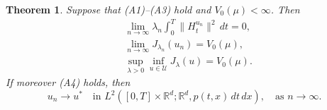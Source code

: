 \documentclass[11pt,leqno]{article}
\theoremstyle{plain}
\newtheorem{thm}{Theorem}
\theoremstyle{remark}
\theoremstyle{definition}
\numberwithin{equation}{section}
\numberwithin{figure}{section}
\numberwithin{table}{section}
\begin{document}
\begin{thm}\label{thm:convergence}
Suppose that {\rm (A1)}--{\rm (A3)} hold and $V_0(\mu)<\infty$.  Then
\begin{align}
 &\lim_{n\to\infty}\lambda_n\int_0^T\|H_t^{u_n}\|^2\,dt = 0, \label{eq:conv-H}\\
 &\lim_{n\to\infty}J_{\lambda_n}(u_n) = V_0(\mu), \label{eq:conv-J}\\
 &\sup_{\lambda>0}\inf_{u\in\mathcal{U}}J_\lambda(u) = V_0(\mu). \label{eq:sup-inf}
\end{align}
If moreover {\rm (A4)} holds, then
\begin{equation}\label{eq:conv-u-L2}
 u_n \longrightarrow u^{\ast}\quad\text{in }L^2([0,T]\times\mathbb{R}^d; \mathbb{R}^d, p(t,x)\,dt\,dx), 
 \quad\text{as }n\to\infty.
\end{equation}
\end{thm}
\end{document}
